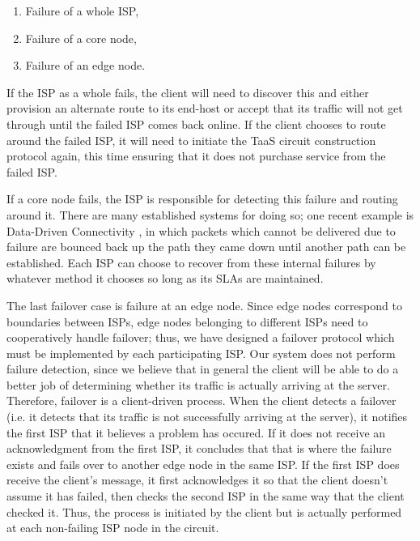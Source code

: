 \documentclass{article}
\begin{document}
\begin{enumerate}
\item Failure of a whole ISP,
\item Failure of a core node,
\item Failure of an edge node.
\end{enumerate}

If the ISP as a whole fails, the client will need to discover this and
either provision an alternate route to its end-host or accept that its
traffic will not get through until the failed ISP comes back
online. If the client chooses to route around the failed ISP, it will
need to initiate the TaaS circuit construction protocol again, this
time ensuring that it does not purchase service from the failed ISP.

If a core node fails, the ISP is responsible for detecting this
failure and routing around it. There are many established systems for
doing so; one recent example is Data-Driven Connectivity \cite{ddc},
in which packets which cannot be delivered due to failure are bounced
back up the path they came down until another path can be
established. Each ISP can choose to recover from these internal
failures by whatever method it chooses so long as its SLAs are
maintained.

The last failover case is failure at an edge node. Since edge nodes
correspond to boundaries between ISPs, edge nodes belonging to
different ISPs need to cooperatively handle failover; thus, we have
designed a failover protocol which must be implemented by each
participating ISP.  Our system does not perform failure detection,
since we believe that in general the client will be able to do a
better job of determining whether its traffic is actually arriving at
the server. Therefore, failover is a client-driven process. When the
client detects a failover (i.e. it detects that its traffic is not
successfully arriving at the server), it notifies the first ISP that
it believes a problem has occured. If it does not receive an
acknowledgment from the first ISP, it concludes that that is where the
failure exists and fails over to another edge node in the same ISP. If
the first ISP does receive the client's message, it first acknowledges
it so that the client doesn't assume it has failed, then checks the
second ISP in the same way that the client checked it. Thus, the
process is initiated by the client but is actually performed at each
non-failing ISP node in the circuit.
\end{document}
